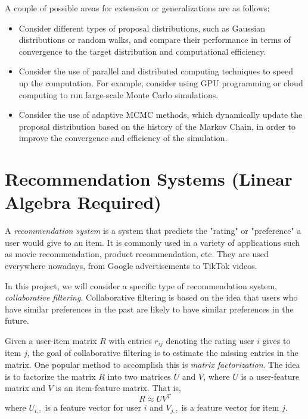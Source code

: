 \documentclass{article}
\begin{document}
\vspace{3mm}
A couple of possible areas for extension or generalizations are as follows:
\begin{itemize}
    \item Consider different types of proposal distributions, such as Gaussian distributions or random walks, and compare their performance in terms of convergence to the target distribution and computational efficiency.
    \item Consider the use of parallel and distributed computing techniques to speed up the computation. For example, consider using GPU programming or cloud computing to run large-scale Monte Carlo simulations.
    \item Consider the use of adaptive MCMC methods, which dynamically update the proposal distribution based on the history of the Markov Chain, in order to improve the convergence and efficiency of the simulation.
\end{itemize}

\pagebreak 

\section{Recommendation Systems (Linear Algebra Required)}
A \textit{recommendation system} is a system that predicts the "rating" or "preference" a user would give to an item. It is commonly used in a variety of applications such as movie recommendation, product recommendation, etc. They are used everywhere nowadays, from Google advertisements to TikTok videos.

\vspace{3mm}
In this project, we will consider a specific type of recommendation system, \textit{collaborative filtering}. Collaborative filtering is based on the idea that users who have similar preferences in the past are likely to have similar preferences in the future. 

\vspace{3mm}
Given a user-item matrix $R$ with entries $r_{ij}$ denoting the rating user $i$ gives to item $j$, the goal of collaborative filtering is to estimate the missing entries in the matrix. One popular method to accomplish this is \textit{matrix factorization}. The idea is to factorize the matrix $R$ into two matrices $U$ and $V$, where $U$ is a user-feature matrix and $V$ is an item-feature matrix. That is, $$R \approx UV^T$$ where $U_{i,:}$ is a feature vector for user $i$ and $V_{j,:}$ is a feature vector for item $j$.
\end{document}
